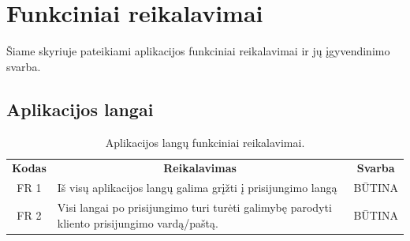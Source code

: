 \documentclass{VUMIFPSkursinis}
\begin{document}
{{{{{\begin{center}
\begin{table}[H]
\begin{tabular}{|p{2cm}|p{13cm}|p{2cm}|}
	\end{tabular}
	
	\label{table:6}	
	\end{table}
\end{center}

\section{Funkciniai reikalavimai}

Šiame skyriuje pateikiami aplikacijos funkciniai reikalavimai ir jų įgyvendinimo svarba.

\subsection{Aplikacijos langai}

\begin{center}
	\begin{table}[H]
	\caption{Aplikacijos langų funkciniai reikalavimai.}
	\begin{tabular}{|p{2cm}|p{}|p{}|}
	\hline
	    \rowcolor{lightgray}
		\multicolumn{3}{|c|}{Aplikacijos langai}\\
		
	\hline
		\multicolumn{1}{|c|}{{\bfseries Kodas}}&
		\multicolumn{1}{|c|}{{\bfseries Reikalavimas}}&
		\multicolumn{1}{|c|}{{\bfseries Svarba}}\\

	\hline
		\multicolumn{1}{|c|}{FR 1} &
		Iš visų aplikacijos langų galima grįžti į prisijungimo langą &
		\multicolumn{1}{|c|}{BŪTINA}\\
	\hline
		\multicolumn{1}{|c|}{FR 2} &
		{Visi langai po prisijungimo turi turėti galimybę parodyti kliento \newline prisijungimo vardą/paštą.}&
		\multicolumn{1}{|c|}{BŪTINA}\\
	\hline
	

\end{tabular}
\end{table}
\end{center}}}}}}
\end{document}
